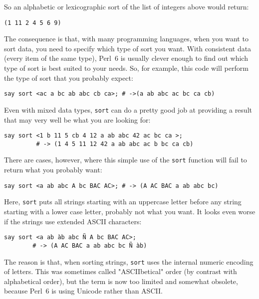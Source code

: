 So an alphabetic or lexicographic sort of the list of 
integers above would return:

\begin{verbatim}
(1 11 2 4 5 6 9)
\end{verbatim}

The consequence is that, with many programming languages, 
when you want to sort data, you need to specify which 
type of sort you want. With consistent data (every item 
of the same type), Perl~6 is usually clever enough to 
find out which type of sort is best suited to your 
needs. So, for example, this code will perform 
the type of sort that you probably expect:

\begin{verbatim}
say sort <ac a bc ab abc cb ca>; # ->(a ab abc ac bc ca cb)
\end{verbatim}

Even with mixed data types, {\tt sort} can do a pretty good 
job at providing a result that may very well be what 
you are looking for:

\begin{verbatim}
say sort <1 b 11 5 cb 4 12 a ab abc 42 ac bc ca >;
         # -> (1 4 5 11 12 42 a ab abc ac b bc ca cb)
\end{verbatim}

There are cases, however, where this simple use of the 
{\tt sort} function will fail to return what you 
probably want:

\begin{verbatim}
say sort <a ab abc A bc BAC AC>; # -> (A AC BAC a ab abc bc)
\end{verbatim}
%

Here, {\tt sort} puts all strings starting with an 
uppercase letter before any string starting with a 
lower case letter, probably not what you want. It 
looks even worse if the strings use extended 
ASCII characters:

\begin{verbatim}
say sort <a ab àb abc Ñ A bc BAC AC>;
        # -> (A AC BAC a ab abc bc Ñ àb)
\end{verbatim}
%

The reason is that, when sorting strings, {\tt sort} 
uses the internal numeric encoding of letters. This 
was sometimes called "ASCIIbetical" order (by contrast 
with alphabetical order), but the term is now too limited 
and somewhat obsolete, because Perl~6 is using Unicode 
rather than ASCII. 

